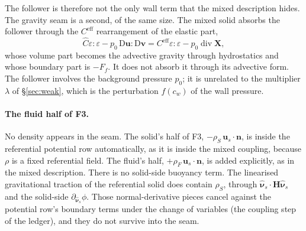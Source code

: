 \documentclass[11pt]{article}
\theoremstyle{definition}
\theoremstyle{remark}
\newcommand{\bu}{\mathbf{u}}
\newcommand{\bv}{\mathbf{v}}
\newcommand{\bn}{\mathbf{n}}
\newcommand{\Div}{\operatorname{div}}
\newcommand{\nuhs}{\hat{\boldsymbol{\nu}}_s}
\begin{document}
The follower is therefore not the only wall term that the mixed
description hides. The gravity seam is a second, of the same size.
The mixed solid absorbs the follower through the $C^{\mathrm{eff}}$
rearrangement of the elastic part,
\begin{equation*}
  \hat C\varepsilon:\varepsilon - p_0\,\mathrm D\bu:\mathrm D\bv =
  C^{\mathrm{eff}}\varepsilon:\varepsilon - p_0\Div\mathbf X ,
\end{equation*}
whose volume part becomes the advective gravity through hydrostatics
and whose boundary part is $-F_f$. It does not absorb it through its
advective form. The follower involves the background pressure $p_0$;
it is unrelated to the multiplier $\lambda$ of \S\ref{sec:weak}, which
is the perturbation $f(c_w)$ of the wall pressure.

\paragraph{The fluid half of F3.} No density appears in the seam. The
solid's half of F3, $-\rho_S\,\bu_s\cdot\bn$, is inside the referential
potential row automatically, as it is inside the mixed coupling,
because $\rho$ is a fixed referential field. The fluid's half,
$+\rho_F\,\bu_s\cdot\bn$, is added explicitly, as in the mixed
description. There is no solid-side buoyancy term. The linearised
gravitational traction of the referential solid does contain $\rho_S$,
through $\nuhs\cdot\mathbf H\nuhs$ and the solid-side
$\partial_{\nuhs}\phi$. Those normal-derivative pieces cancel against the
potential row's boundary terms under the change of variables
(the coupling step of the ledger), and they do not survive into the
seam.
\end{document}
